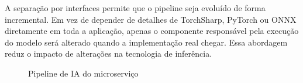 A separação por interfaces permite que o pipeline seja evoluído de forma incremental. Em vez de depender de detalhes de TorchSharp, PyTorch ou ONNX diretamente em toda a aplicação, apenas o componente responsável pela execução do modelo será alterado quando a implementação real chegar. Essa abordagem reduz o impacto de alterações na tecnologia de inferência.

\begin{figure}[H]
    \centering
    \caption{Pipeline de IA do microserviço}
    \label{fig:pipeline-ia}
\end{figure}
